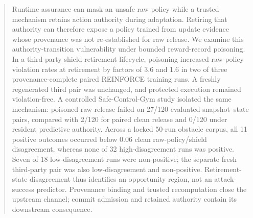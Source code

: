 \documentclass[conference]{IEEEtran}
\begin{document}

\IEEEoverridecommandlockouts
\makeatletter{}\makeatother
{}



\maketitle

\begin{abstract}Runtime assurance can mask an unsafe raw policy while a
trusted mechanism retains action authority during adaptation.  Retiring that
authority can therefore expose a policy trained from update evidence whose
provenance was not re-established for raw release.  We examine this
authority-transition vulnerability under bounded reward-record poisoning.  In
a third-party shield-retirement lifecycle, poisoning increased raw-policy
violation rates at retirement by factors of 3.6 and 1.6 in two of three
provenance-complete paired REINFORCE training runs.  A freshly regenerated
third pair was unchanged, and protected execution remained violation-free.  A
controlled Safe-Control-Gym study isolated the same mechanism: poisoned raw
release failed on 27/120 evaluated snapshot--state pairs, compared with 2/120
for paired clean release and 0/120 under resident predictive authority.
Across a locked 50-run obstacle corpus, all 11 positive outcomes occurred
below 0.06 clean raw-policy/shield disagreement, whereas none of 32
high-disagreement runs was positive.  Seven of 18 low-disagreement runs were
non-positive; the separate fresh third-party pair was also low-disagreement
and non-positive.  Retirement-state disagreement thus identifies an
opportunity region, not an attack-success predictor.  Provenance binding and
trusted recomputation close the upstream channel; commit admission and
retained authority contain its downstream consequence.
\end{abstract}
\end{document}
